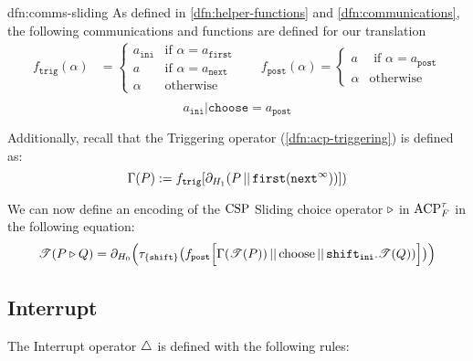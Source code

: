 \documentclass[../hons_project.tex]{subfiles}
\begin{document}
\begin{dfn}{dfn:comms-sliding}{}
	As defined in \ref{dfn:helper-functions} and \ref{dfn:communications}, the following communications and functions are defined for our translation
	\begin{align*}
		f_{\mathtt{trig}}(\alpha)             & = \begin{cases}
			                                          a_{\mathtt{ini}} & \text{if } \alpha = a_{\mathtt{first}} \\
			                                          a                & \text{if } \alpha = a_{\mathtt{next}}  \\
			                                          \alpha           & \text{otherwise}
		                                          \end{cases} \quad
											  &f_{\mathtt{post}}(\alpha)             = \begin{cases}
			                                          a      & \text{ if } \alpha = a_{\mathtt{post}} \\
			                                          \alpha & \text{otherwise}
		                                          \end{cases}                                                                    \\
	\end{align*}
		\[a_{\mathtt{ini}} | \mathtt{choose} = a_{\mathtt{post}}\]

	\longrule{0.08ex}

	Additionally, recall that the Triggering operator (\ref{dfn:acp-triggering}) is defined as:
	\[\Gamma(P) := f_{\mathtt{trig}}[\partial_{H_{1}}(P \merge \mathtt{first}(\mathtt{next}^{\infty}))])\]
\end{dfn}

We can now define an encoding of the $\csp$ Sliding choice operator $\sliding$ in $\acptf$ in the following equation:
\[\trans{P \sliding Q} = \partial_{H_{0}}\Bigl(\tau_{\{\mathtt{shift}\}}\bigl(f_{\mathtt{post}}\Bigl[ \Gamma(\trans{P}) \merge \mathrm{choose} \merge \mathtt{shift}_{\mathtt{ini}} . \trans{Q}) \Bigr]\bigr)\Bigr)\]


\subsection{Interrupt}\label{ssec:interrupt}

The Interrupt operator $\interrupt$ is defined with the following rules:
\end{document}
